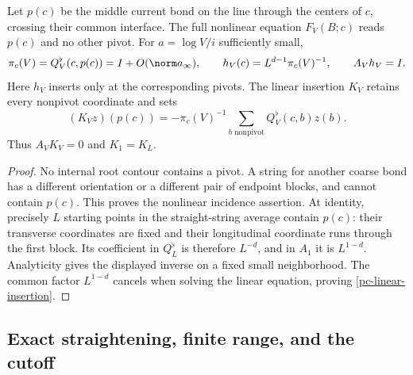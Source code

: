 \begin{lemma}\label{pc-pivot-lemma}
Let $p(c)$ be the middle current bond on the line through the
centers of $c$, crossing their common interface. The full
nonlinear equation $F_V(B;c)$ reads $p(c)$ and no other pivot.
For $a=\log V/i$ sufficiently small,
\begin{equation}\label{pc-pivot-inverse}
 \pi_c(V)=Q_V^\flat(c,p(c))=I+O(\norm a_\infty),\qquad
 h_V(c)=L^{d-1}\pi_c(V)^{-1},\qquad A_Vh_V=I.
\end{equation}
Here $h_V$ inserts only at the corresponding pivots. The linear
insertion $K_V$ retains every nonpivot coordinate and sets
\begin{equation}\label{pc-linear-insertion}
 (K_Vz)(p(c))=-\pi_c(V)^{-1}
       \sum_{b\text{ nonpivot}}Q_V^\flat(c,b)z(b).
\end{equation}
Thus $A_VK_V=0$ and $K_1=K_L$.
\end{lemma}

\begin{proof}
No internal root contour contains a pivot. A string for another
coarse bond has a different orientation or a different pair of
endpoint blocks, and cannot contain $p(c)$. This proves the
nonlinear incidence assertion. At identity, precisely $L$
starting points in the straight-string average contain $p(c)$:
their transverse coordinates are fixed and their longitudinal
coordinate runs through the first block. Its coefficient in
$Q_L^\flat$ is therefore $L^{-d}$, and in $A_1$ it is
$L^{1-d}$. Analyticity gives the displayed inverse on a fixed
small neighborhood. The common factor $L^{1-d}$ cancels when
solving the linear equation, proving
\eqref{pc-linear-insertion}.
\end{proof}

\subsection{Exact straightening, finite range, and the cutoff}
\label{pc-chart-section}

